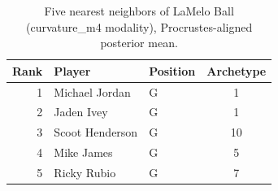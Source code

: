 \begin{table}[htbp]
  \centering\small
  \begin{tabular}{rllc}
    \toprule
    Rank & Player & Position & Archetype \\
    \midrule
    1 & Michael Jordan & G & 1 \\
    2 & Jaden Ivey & G & 1 \\
    3 & Scoot Henderson & G & 10 \\
    4 & Mike James & G & 5 \\
    5 & Ricky Rubio & G & 7 \\
    \bottomrule
  \end{tabular}
  \caption{Five nearest neighbors of LaMelo Ball (curvature_m4 modality), Procrustes-aligned posterior mean.}
  \label{tab:LaMelo_Ball_neighbors_curvature_m4}
\end{table}

